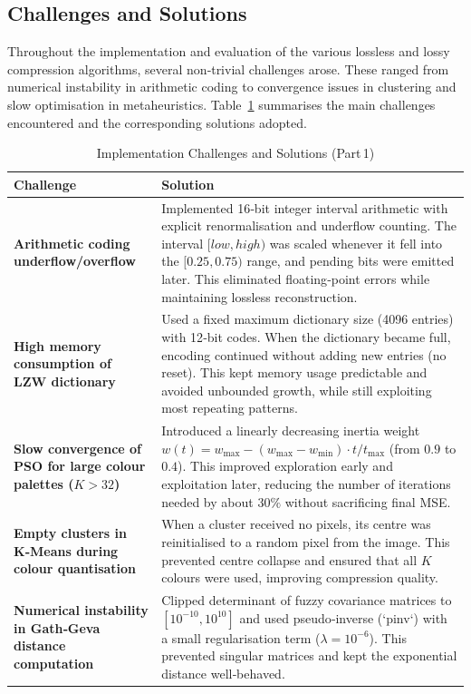 
\subsection{Challenges and Solutions}

Throughout the implementation and evaluation of the various lossless and lossy compression algorithms, several non‑trivial challenges arose. These ranged from numerical instability in arithmetic coding to convergence issues in clustering and slow optimisation in metaheuristics. Table~\ref{tab:challenges_a} summarises the main challenges encountered and the corresponding solutions adopted.




\begin{table}[H]
\centering
\small
\caption{Implementation Challenges and Solutions (Part 1)}
\label{tab:challenges_a}
\begin{tabularx}{\textwidth}{|p{4.5cm}|X|}
\hline
\textbf{Challenge} & \textbf{Solution} \\
\hline
\textbf{Arithmetic coding underflow/overflow} & 
Implemented 16‑bit integer interval arithmetic with explicit renormalisation and underflow counting. The interval $[low, high)$ was scaled whenever it fell into the $[0.25, 0.75)$ range, and pending bits were emitted later. This eliminated floating‑point errors while maintaining lossless reconstruction. \\
\hline
\textbf{High memory consumption of LZW dictionary} & 
Used a fixed maximum dictionary size (4096 entries) with 12‑bit codes. When the dictionary became full, encoding continued without adding new entries (no reset). This kept memory usage predictable and avoided unbounded growth, while still exploiting most repeating patterns. \\
\hline
\textbf{Slow convergence of PSO for large colour palettes ($K>32$)} & 
Introduced a linearly decreasing inertia weight $w(t) = w_{\max} - (w_{\max}-w_{\min}) \cdot t/t_{\max}$ (from $0.9$ to $0.4$). This improved exploration early and exploitation later, reducing the number of iterations needed by about $30\%$ without sacrificing final MSE. \\
\hline
\textbf{Empty clusters in K‑Means during colour quantisation} & 
When a cluster received no pixels, its centre was reinitialised to a random pixel from the image. This prevented centre collapse and ensured that all $K$ colours were used, improving compression quality. \\
\hline
\textbf{Numerical instability in Gath‑Geva distance computation} & 
Clipped determinant of fuzzy covariance matrices to $[10^{-10}, 10^{10}]$ and used pseudo‑inverse (`pinv`) with a small regularisation term ($\lambda = 10^{-6}$). This prevented singular matrices and kept the exponential distance well‑behaved. \\
\hline
\end{tabularx}
\end{table}



